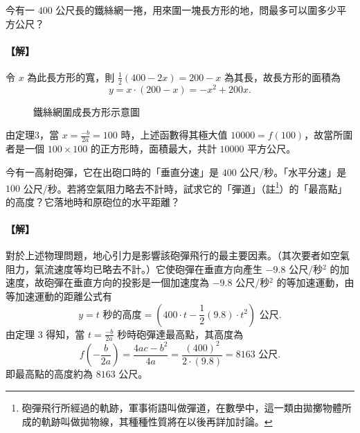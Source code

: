 \begin{example}\label{ex:b2_1-4-1}
今有一 $400$ 公尺長的鐵絲網一捲，用來圍一塊長方形的地，問最多可以圍多少平方公尺？
\end{example}
\paragraph{【解】}
令 $x$ 為此長方形的寬，則 $\frac{1}{2}(400-2x) = 200-x$ 為其長，故長方形的面積為
\[
y = x\cdot (200-x) = -x^2+200x.
\]

\begin{figure}[htbp]
\centering
{}
\caption{鐵絲網圍成長方形示意圖}
\label{fig:fenced_field}
\end{figure}

由定理3，當 $x = \frac{-b}{2a} = 100$ 時，上述函數得其極大值 $10000 = f(100)$，故當所圍者是一個 $100 \times 100$ 的正方形時，面積最大，共計 $10000$ 平方公尺。


\begin{example}\label{ex:b2_1-4-2}
今有一高射砲彈，它在出砲口時的「垂直分速」是 $400$ 公尺/秒。「水平分速」是 $100$ 公尺/秒。若將空氣阻力略去不計時，試求它的「彈道」（註\footnote{砲彈飛行所經過的軌跡，軍事術語叫做彈道，在數學中，這一類由拋擲物體所成的軌跡叫做拋物線，其種種性質將在以後再詳加討論。}）的「最高點」的高度？它落地時和原砲位的水平距離？
\end{example}
\paragraph{【解】}
對於上述物理問題，地心引力是影響該砲彈飛行的最主要因素。（其次要者如空氣阻力，氣流速度等均已略去不計。）它使砲彈在垂直方向產生 $-9.8$ 公尺/秒$^2$ 的加速度，故砲彈在垂直方向的投影是一個加速度為 $-9.8$ 公尺/秒$^2$ 的等加速運動，由等加速運動的距離公式有
\[
y = t\text{ 秒的高度} = \left(400\cdot t - \frac{1}{2}(9.8)\cdot t^2\right) \text{ 公尺}.
\]
由定理 3 得知，當 $t = \frac{-b}{2a}$ 秒時砲彈達最高點，其高度為
\[
f\left(-\frac{b}{2a}\right) = \frac{4ac-b^2}{4a} = \frac{(400)^2}{2\cdot(9.8)} = 8163\text{ 公尺}.
\]
即最高點的高度約為 $8163$ 公尺。

